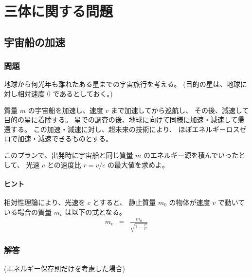 \section{三体に関する問題}
\label{s:三体に関する問題}

\subsection{宇宙船の加速}
\label{ssec:宇宙船の加速}
\subsubsection{問題}
\label{sssec:宇宙船の加速:問題}

地球から何光年も離れたある星までの宇宙旅行を考える。
(目的の星は、地球に対し相対速度 0 であるとしておく。)

質量 $m$ の宇宙船を加速し、速度 $v$ まで加速してから巡航し、
その後、減速して目的の星に着陸する。
星での調査の後、地球に向けて同様に加速・減速して帰還する。
この加速・減速に対し、超未来の技術により、
ほぼエネルギーロスゼロで加速・減速できるものとする。

このプランで、出発時に宇宙船と同じ質量 $m$ のエネルギー源を積んでいったとして、
光速 $c$ との速度比 $r = v/c$ の最大値を求めよ。

\paragraph*{ヒント}
相対性理論により、光速を $c$ とすると、
静止質量 $m_0$ の物体が速度 $v$ で動いている場合の質量 $m_v$ は以下の式となる。
  \begin{eqnarray}
    m_v & = & \frac{m_0}{\sqrt{1-\frac{v^2}{c^2}}}
  \end{eqnarray}

\clearpage
\subsubsection{解答}
\label{sssec:宇宙船の加速:解答}
(エネルギー保存則だけを考慮した場合)

